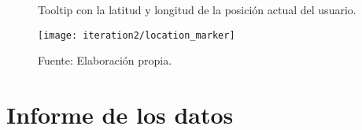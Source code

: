 \begin{figure}[H]
  \begin{center}
    \caption{Tooltip con la latitud y longitud de la posición actual del usuario.}
    \label{fig:location_marker}
    \texttt{[image: iteration2/location\_marker]}
    \caption*{Fuente: Elaboración propia.}
  \end{center}
\end{figure}




\section{Informe de los datos}
\label{sec:Informe de los datos}
